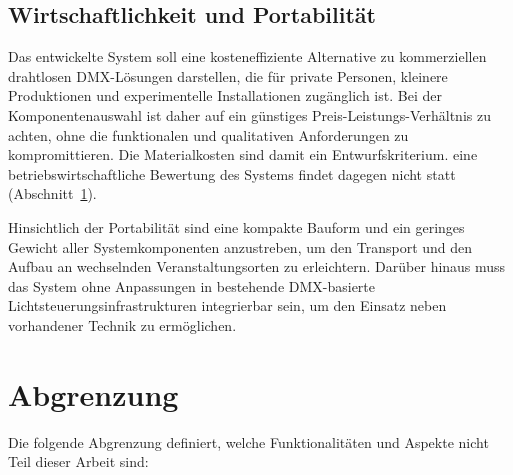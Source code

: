 \subsection{Wirtschaftlichkeit und Portabilität}
\label{subsec:wirtschaftlichkeit}

Das entwickelte System soll eine kosteneffiziente Alternative zu kommerziellen
drahtlosen DMX-Lösungen darstellen, die für private Personen, kleinere Produktionen und
experimentelle Installationen zugänglich ist. Bei der Komponentenauswahl
ist daher auf ein günstiges Preis-Leistungs-Verhältnis zu achten, ohne
die funktionalen und qualitativen Anforderungen zu kompromittieren. Die Materialkosten
sind damit ein Entwurfskriterium. eine betriebswirtschaftliche Bewertung des Systems
findet dagegen nicht statt (Abschnitt~\ref{sec:abgrenzung}).

Hinsichtlich der Portabilität sind eine kompakte Bauform und ein geringes
Gewicht aller Systemkomponenten anzustreben, um den Transport und den Aufbau
an wechselnden Veranstaltungsorten zu erleichtern. Darüber hinaus muss das
System ohne Anpassungen in bestehende DMX-basierte Lichtsteuerungsinfrastrukturen
integrierbar sein, um den Einsatz neben vorhandener Technik zu ermöglichen.

\section{Abgrenzung}
\label{sec:abgrenzung}

Die folgende Abgrenzung definiert, welche Funktionalitäten und Aspekte nicht Teil dieser Arbeit sind:

